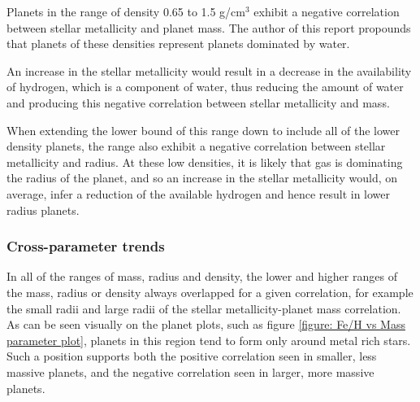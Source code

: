 \documentclass[a4paper,twocolumn,12pt]{article}
\begin{document}


Planets in the range of density 0.65 to 1.5 g/cm$^3$ exhibit a negative correlation between stellar metallicity and planet mass. The author of this report propounds that planets of these densities represent planets dominated by water.

An increase in the stellar metallicity would result in a decrease in the availability of hydrogen, which is a component of water, thus reducing the amount of water and producing this negative correlation between stellar metallicity and mass. %

When extending the lower bound of this range down to include all of the lower density planets, the range also exhibit a negative correlation between stellar metallicity and radius. At these low densities, it is likely that gas is dominating the radius of the planet, and so an increase in the stellar metallicity would, on average, infer a reduction of the available hydrogen and hence result in lower radius planets.


\subsubsection{Cross-parameter trends}

In all of the ranges of mass, radius and density, the lower and higher ranges of the mass, radius or density always overlapped for a given correlation, for example the small radii and large radii of the stellar metallicity-planet mass correlation. As can be seen visually on the planet plots, such as figure \ref{figure: Fe/H vs Mass parameter plot}, planets in this region tend to form only around metal rich stars. Such a position supports both the positive correlation seen in smaller, less massive planets, and the negative correlation seen in larger, more massive planets.
\end{document}
